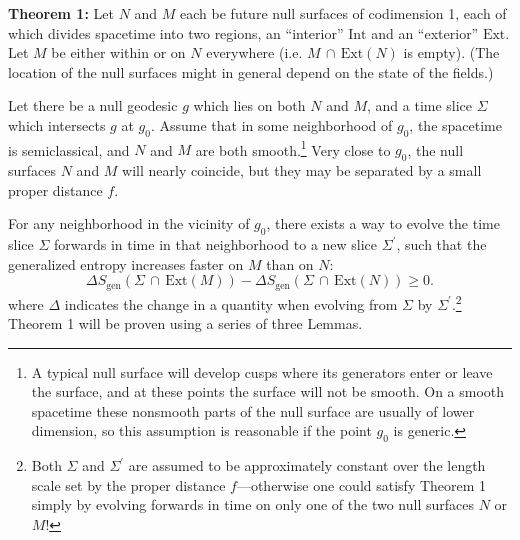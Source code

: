 \documentclass{article}
\begin{document}
\textbf{Theorem 1:}  Let $N$ and $M$ each be future null surfaces of codimension 1, each of which divides spacetime into two regions, an ``interior'' $\mathrm{Int}$ and an ``exterior'' $\mathrm{Ext}$.  Let $M$ be either within or on $N$ everywhere (i.e. $M\,\cap\,\mathrm{Ext}(N)$ is empty).  (The location of the null surfaces might in general depend on the state of the fields.)

Let there be a null geodesic $g$ which lies on both $N$ and $M$, and a time slice $\Sigma$ which intersects $g$ at $g_0$.  Assume that in some neighborhood of $g_0$, the spacetime is semiclassical, and $N$ and $M$ are both smooth.\footnote{A typical null surface will develop cusps where its generators enter or leave the surface, and at these points the surface will not be smooth.  On a smooth spacetime these nonsmooth parts of the null surface are usually of lower dimension, so this assumption is reasonable if the point $g_0$ is generic.}  Very close to $g_0$, the null surfaces $N$ and $M$ will nearly coincide, but they may be separated by a small proper distance $f$.

For any neighborhood in the vicinity of $g_0$, there exists a way to evolve the time slice
$\Sigma$ forwards in time in that neighborhood to a new slice $\Sigma^\prime$, such that the generalized entropy increases faster on $M$ than on $N$:
\begin{equation}\label{ft}
\Delta S_\mathrm{gen}(\Sigma\,\cap\,\mathrm{Ext}(M)) - 
\Delta S_\mathrm{gen}(\Sigma\,\cap\,\mathrm{Ext}(N)) \ge 0.
\end{equation}
where $\Delta$ indicates the change in a quantity when evolving from $\Sigma$ by $\Sigma^\prime$.\footnote{Both $\Sigma$ and $\Sigma^\prime$ are assumed to be approximately constant over the length scale set by the proper distance $f$---otherwise one could satisfy Theorem 1 simply by evolving forwards in time on only one of the two null surfaces $N$ or $M$!}  Theorem 1 will be proven using a series of three Lemmas.
\end{document}
